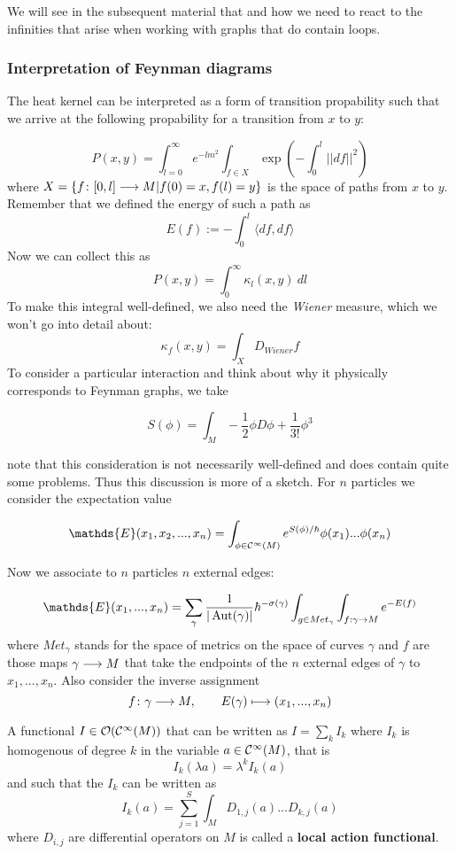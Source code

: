 We will see in the subsequent material that and how we need to react to the infinities that arise when working with graphs that do contain loops.


\subsubsection{Interpretation of Feynman diagrams}
\label{subsubsec:feynman_intepretation}

The heat kernel can be interpreted as a form of transition propability such that we arrive at the following propability for a transition from $x$ to $y$:

$$ P(x,y) = \int_{l=0}^\infty e^{-lm^2} \int_{f\in X}  \exp\left( - \int_0^l ||df||^2 \right)$$
where $X = \{f \colon [0,l] \longrightarrow M | f(0) = x, f(l) = y \}$ is the space of paths from $x$ to $y$. Remember that we defined the energy of such a path as
$$ E(f) := - \int_0^l \langle df, df \rangle $$
Now we can collect this as
$$ P(x,y) = \int_0^\infty \kappa_l(x,y) \ dl $$
To make this integral well-defined, we also need the \emph{Wiener} measure, which we won't go into detail about:
$$ \kappa_f (x,y) = \int_X D_{Wiener} f $$
To consider a particular interaction and think about why it physically corresponds to Feynman graphs, we take

$$ S(\phi) = \int_M - \frac{1}{2} \phi D\phi + \frac{1}{3!} \phi^3 $$

note that this consideration is not necessarily well-defined and does contain quite some problems. Thus this discussion is more of a sketch. For $n$ particles we consider the expectation value

$$ \mathds{E}(x_1, x_2, ..., x_n) = \int_{\phi \in \Ci(M)} e^{S(\phi)/\hbar} \phi(x_1) ... \phi(x_n) $$

Now we associate to $n$ particles $n$ external edges:

$$ \mathds{E}(x_1, ..., x_n) = \sum_\gamma \frac{1}{|\Aut(\gamma)|} \hbar^{-\sigma(\gamma)} \int_{g \in Met_\gamma} \int_{f: \gamma \ra M} e^{-E(f)} $$
where $Met_\gamma$ stands for the space of metrics on the space of curves $\gamma$ and $f$ are those maps $\gamma \longrightarrow M$ that take the endpoints of the $n$ external edges of $\gamma$ to $x_1,...,x_n$. Also consider the inverse assignment
$$ f \colon \gamma \longrightarrow M, \quad \quad E(\gamma) \longmapsto (x_1,...,x_n) $$

\begin{definition}
  A functional $I \in \mathcal{O}(\mathcal{C}^{\infty}(M))$ that can be written as $I = \sum_k I_k$ where $I_k$ is homogenous of degree $k$ in the variable $a \in \mathcal{C}^{\infty}(M)$, that is
  $$ I_k(\lambda a) = \lambda^k I_k(a) $$
  and such that the $I_k$ can be written as
  $$ I_k (a) = \sum_{j=1}^{S} \int_M D_{1,j} (a) ... D_{k,j} (a) $$
  where $D_{i,j}$ are differential operators on $M$ is called a \textbf{local action functional}.
\end{definition}

